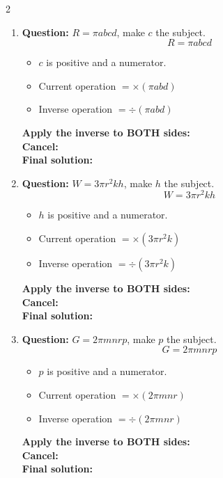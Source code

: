 \documentclass[11pt]{article}
\begin{document}
\begin{multicols}{2}
\begin{enumerate}[leftmargin=*, itemsep=10pt]
\columnbreak
\item \textbf{Question:} \( R = \pi a b c d \), make \( c \) the subject.
\[
R=\pi abcd
\]
\begin{itemize}[leftmargin=*, itemsep=2pt]
\item \(c\) is positive and a numerator.
\item Current operation \(= \times (\pi abd)\)
\item Inverse operation \(= \div (\pi abd)\)
\end{itemize}
\textbf{Apply the inverse to BOTH sides:} \\[1.5cm]
\textbf{Cancel:} \\[1.5cm]
\textbf{Final solution:}\\[1.5cm]

\item \textbf{Question:} \( W = 3\pi r^{2}kh \), make \( h \) the subject.
\[
W=3\pi r^{2}kh
\]
\begin{itemize}[leftmargin=*, itemsep=2pt]
\item \(h\) is positive and a numerator.
\item Current operation \(= \times (3\pi r^{2}k)\)
\item Inverse operation \(= \div (3\pi r^{2}k)\)
\end{itemize}
\textbf{Apply the inverse to BOTH sides:} \\[1.5cm]
\textbf{Cancel:} \\[1.5cm]
\textbf{Final solution:}\\[1.5cm]

\newpage
\item \textbf{Question:} \( G = 2\pi mnrp \), make \( p \) the subject.
\[
G=2\pi mnrp
\]
\begin{itemize}[leftmargin=*, itemsep=2pt]
\item \(p\) is positive and a numerator.
\item Current operation \(= \times (2\pi mnr)\)
\item Inverse operation \(= \div (2\pi mnr)\)
\end{itemize}
\textbf{Apply the inverse to BOTH sides:} \\[1.5cm]
\textbf{Cancel:} \\[1.5cm]
\textbf{Final solution:}\\[1.5cm]


\end{enumerate}
\end{multicols}
\end{document}
